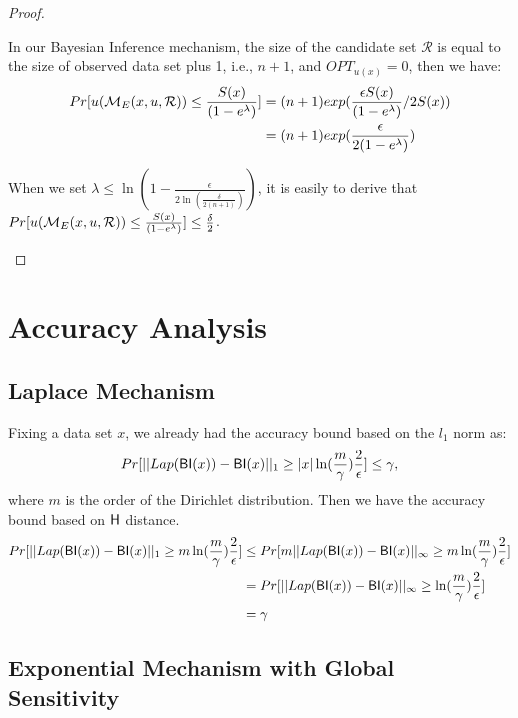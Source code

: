 \begin{proof}
\begin{itemize}
In our Bayesian Inference mechanism, the size of the candidate set $\mathcal{R}$ is equal to the size of observed data set plus 1, i.e., $n + 1$, and $OPT_{u(x)} = 0$, then we have:
\begin{equation*}
\begin{split}
Pr[u(\mathcal{M}_E(x, u, \mathcal{R})) \leq \frac{S(x)}{(1 - e ^ {\lambda})}] 
& = (n + 1)exp(\frac{\epsilon S(x)}{(1 - e ^ {\lambda})}/2 S(x))\\
& = (n + 1)exp(\frac{\epsilon}{2 (1 - e ^ {\lambda})})\\
\end{split}
\end{equation*}

When we set $\lambda \leq \ln(1 - \frac{\epsilon}{2 \ln (\frac{\delta}{2 (n + 1)})})$, it is easily to derive that $Pr[u(\mathcal{M}_E(x, u, \mathcal{R})) \leq \frac{S(x)}{(1 - e ^ {\lambda})}] \leq \frac{\delta}{2}$.

\end{itemize}

\end{proof}

\section{Accuracy Analysis}
\subsection{Laplace Mechanism}
Fixing a data set $x$, we already had the accuracy bound based on the $l_1$ norm as:
\begin{equation*}
Pr[||Lap(\mathsf{BI}(x)) - \mathsf{BI}(x)||_1 \geq |x| \ln (\frac{m}{\gamma}) \frac{2}{\epsilon}] \leq \gamma,
\end{equation*}
where $m$ is the order of the Dirichlet distribution. Then we have the accuracy bound based on $\mathsf{H}$ distance.
\begin{equation*}
\begin{split}
Pr[||Lap(\mathsf{BI}(x)) - \mathsf{BI}(x)||_1 \geq m \ln (\frac{m}{\gamma}) \frac{2}{\epsilon}] & \leq Pr[m ||Lap(\mathsf{BI}(x)) - \mathsf{BI}(x)||_{\infty} \geq m \ln (\frac{m}{\gamma}) \frac{2}{\epsilon}]\\
& = Pr[||Lap(\mathsf{BI}(x)) - \mathsf{BI}(x)||_{\infty} \geq \ln (\frac{m}{\gamma}) \frac{2}{\epsilon}]\\
& = \gamma
\end{split} 
\end{equation*}


\subsection{Exponential Mechanism with Global Sensitivity}


